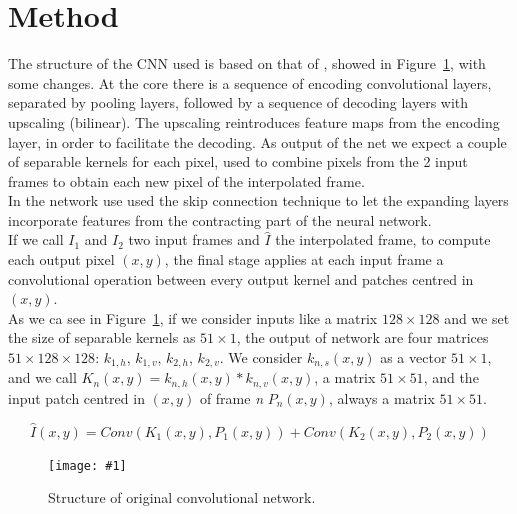 \documentclass[11pt, a4paper]{article}
\newcommand{\image}[3]{
	\begin{figure}%
		\centering
		\texttt{[image: \#1]}
		\caption{#2.}
		\label{#3}
	\end{figure}
}
\begin{document}
	\section{Method} %
	The structure of the CNN used is based on that of \cite{mainpaper}, showed in Figure~\ref{original-net}, with some changes. At the core there is a sequence of encoding convolutional layers, separated by pooling layers, followed by a sequence of decoding layers with upscaling (bilinear). The upscaling reintroduces feature maps from the encoding layer, in order to facilitate the decoding. As output of the net we expect a couple of separable kernels for each pixel, used to combine pixels from the 2 input frames to obtain each new pixel of the interpolated frame. \\
	In the network use used the skip connection technique to let the expanding	layers incorporate features from the contracting part of the neural network.\\
	If we call $I_1$ and $I_2$ two input frames and $\hat{I}$ the interpolated frame, to compute each output pixel $(x,y)$, the final stage applies at each input frame a convolutional operation between every output kernel and patches centred in $(x,y)$.\\
	As we ca see in Figure~\ref{original-net}, if we consider inputs like a matrix $128\times128$ and we set the size of separable kernels as $51\times1$, the output of network are four matrices $51\times128\times128$: $k_{1,h}$, $k_{1,v}$, $k_{2,h}$, $k_{2,v}$. We consider $k_{n,s}(x,y)$ as a vector $51\times1$, and we call $K_n(x,y) = k_{n,h}(x,y) * k_{n,v}(x,y)$, a matrix $51\times51$, and the input patch centred in $(x,y)$ of frame \textit{n} $P_n(x,y)$, always a matrix $51\times51$.
	
	\begin{equation}
		\hat{I}(x,y) = Conv(K_1(x,y), P_1(x,y)) + Conv(K_2(x,y), P_2(x,y))
	\end{equation}
	
	\image{net_structure}{Structure of original convolutional network}{original-net}
\end{document}
